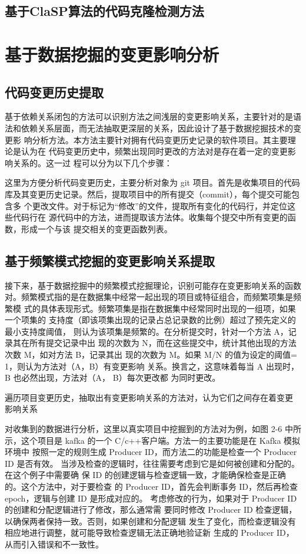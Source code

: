 \subsection{基于ClaSP算法的代码克隆检测方法}

\section{基于数据挖掘的变更影响分析}
\subsection{代码变更历史提取}
基于依赖关系闭包的方法可以识别方法之间浅层的变更影响关系，主要针对的是语
法和依赖关系层面，而无法抽取更深层的关系，因此设计了基于数据挖掘技术的变更影
响分析方法。本方法主要针对拥有代码变更历史记录的软件项目。其主要理论是认为在
代码变更历史中，频繁出现同时更改的方法对是存在着一定的变更影响关系的。这一过
程可以分为以下几个步骤：

这里为方便分析代码变更历史，主要分析对象为 git 项目。首先是收集项目的代码
库及其变更历史记录。然后，提取项目中的所有提交（commit），每个提交可能包含多
个更改文件。对于标记为“修改”的文件，提取所有变化的代码行，并定位这些代码行在
源代码中的方法，进而提取该方法体。收集每个提交中所有变更的函数，形成一个与该
提交相关的变更函数列表。

\subsection{基于频繁模式挖掘的变更影响关系提取}

接下来，基于数据挖掘中的频繁模式挖掘理论，识别可能存在变更影响关系的函数
对。频繁模式指的是在数据集中经常一起出现的项目或特征组合，而频繁项集是频繁模
式的具体表现形式。频繁项集是指在数据集中经常同时出现的一组项，如果一个项集的
支持度（即该项集出现的记录占总记录数的比例）超过了预先定义的最小支持度阈值，
则认为该项集是频繁的。在分析提交时，针对一个方法 A，记录其在所有提交记录中出
现的次数为 N，而在这些提交中，统计其他出现的方法次数 M，如对方法 B，记录其出
现的次数为 M。如果 M/N 的值为设定的阈值= 1，则认为方法对（A，B）有变更影响
关系。换言之，这意味着每当 A 出现时，B 也必然出现，方法对（A， B）每次更改都
为同时更改。

遍历项目变更历史，抽取出有变更影响关系的方法对，认为它们之间存在着变更
影响关系

对收集到的数据进行分析，这里以真实项目中挖掘到的方法对为例，如图 2-6 中所
示，这个项目是 kafka 的一个 C/c++客户端。方法一的主要功能是在 Kafka 模拟环境中
按照一定的规则生成 Producer ID，而方法二的功能是检查一个 Producer ID 是否有效。
当涉及检查的逻辑时，往往需要考虑到它是如何被创建和分配的。在这个例子中需要确
保 ID 的创建逻辑与检查逻辑一致，才能确保检查是正确的。这个方法中，对于要检查
的 Producer ID，首先会判断事务 ID，然后再检查 epoch，逻辑与创建 ID 是形成对应的。
考虑修改的行为，如果对于 Producer ID 的创建和分配逻辑进行了修改，那么通常需
要同时修改 Producer ID 检查逻辑，以确保两者保持一致。否则，如果创建和分配逻辑
发生了变化，而检查逻辑没有相应地进行调整，就可能导致检查逻辑无法正确地验证新
生成的 Producer ID，从而引入错误和不一致性。

